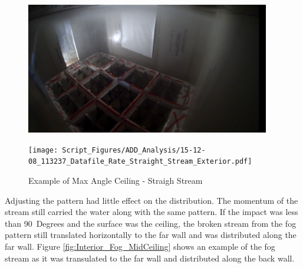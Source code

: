 \documentclass[12pt,oneside]{book}
\begin{document}
\begin{figure}[H]
	\centering
	\begin{minipage}[b]{0.45\textwidth}
	\centering
	\includegraphics[width=0.95\textwidth]{Figures/Water_Distribution/Nozzle_Directions/Exterior_MaxAngleCeiling_SS.png}
	\end{minipage}
	\begin{minipage}[b]{0.45\textwidth}
	\centering
	\texttt{[image: Script\_Figures/ADD\_Analysis/15-12-08\_113237\_Datafile\_Rate\_Straight\_Stream\_Exterior.pdf]}
	\end{minipage}
	\caption{Example of Max Angle Ceiling - Straigh Stream}
	\label{fig:MaxAngle_Exterior}
\end{figure}

Adjusting the pattern had little effect on the distribution. The momentum of the stream still carried the water along with the same pattern. If the impact was less than 90~Degrees and the surface was the ceiling, the broken stream from the fog pattern still translated horizontally to the far wall and was distributed along the far wall. Figure \ref{fig:Interior_Fog_MidCeiling} shows an example of the fog stream as it was transulated to the far wall and distributed along the back wall.
\end{document}
